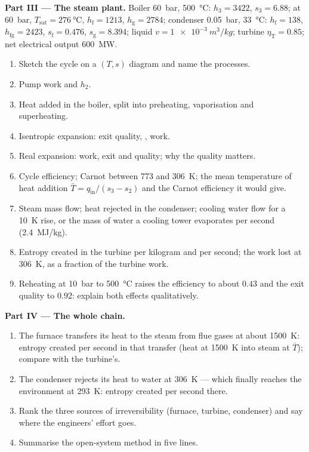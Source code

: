 \begin{problem}
\textbf{Part III --- The steam plant.}
Boiler \qty{60}{bar}, \qty{500}{\celsius}: $h_3 = 3422$, $s_3 = 6.88$; at
\qty{60}{bar}, $T_{\text{sat}} = \qty{276}{\celsius}$, $h_{\text{f}} = 1213$,
$h_{\text{g}} = 2784$; condenser \qty{0.05}{bar}, \qty{33}{\celsius}:
$h_{\text{f}} = 138$, $h_{\text{fg}} = 2423$, $s_{\text{f}} = 0.476$, $s_{\text{g}} =
8.394$; liquid $v = \qty{1e-3}{m^3/kg}$; turbine $\eta_{\text{T}} = 0.85$;
net electrical output \qty{600}{MW}.
\begin{enumerate}[resume]
  \item Sketch the cycle on a $(T,s)$ diagram and name the processes.
  \item Pump work and $h_2$.
  \item Heat added in the boiler, split into preheating, vaporisation
        and superheating.
  \item Isentropic expansion: exit quality, , work.
  \item Real expansion: work, exit  and quality; why the
        quality matters.
  \item Cycle efficiency; Carnot between \qty{773}{} and \qty{306}{K};
        the mean temperature of heat addition $\bar T = q_{\text{in}}/(s_3
        - s_2)$ and the Carnot efficiency it would give.
  \item Steam mass flow; heat rejected in the condenser; cooling water
        flow for a \qty{10}{K} rise, or the mass of water a cooling
        tower evaporates per second (\qty{2.4}{MJ/kg}).
  \item Entropy created in the turbine per kilogram and per second;
        the work lost at \qty{306}{K}, as a fraction of the turbine
        work.
  \item Reheating at \qty{10}{bar} to \qty{500}{\celsius} raises the
        efficiency to about $0.43$ and the exit quality to $0.92$:
        explain both effects qualitatively.
\end{enumerate}

\textbf{Part IV --- The whole chain.}
\begin{enumerate}[resume]
  \item The furnace transfers its heat to the steam from flue gases at
        about \qty{1500}{K}: entropy created per second in that transfer
        (heat at \qty{1500}{K} into steam at $\bar T$); compare with the
        turbine's.
  \item The condenser rejects its heat to water at \qty{306}{K} ---
        which finally reaches the environment at \qty{293}{K}: entropy
        created per second there.
  \item Rank the three sources of irreversibility (furnace, turbine,
        condenser) and say where the engineers' effort goes.
  \item Summarise the open-system method in five lines.
\end{enumerate}
\end{problem}
